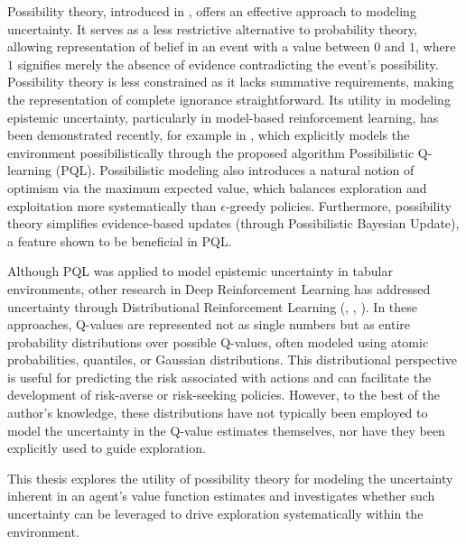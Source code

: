 \documentclass[11pt,a4paper]{report}
\begin{document}
\par
Possibility theory, introduced in \cite{ZADEH19999}, offers an effective approach to modeling uncertainty. It serves as a less restrictive alternative to probability theory, allowing representation of belief in an event with a value between $0$ and $1$, where $1$ signifies merely the absence of evidence contradicting the event's possibility. Possibility theory is less constrained as it lacks summative requirements, making the representation of complete ignorance straightforward. Its utility in modeling epistemic uncertainty, particularly in model-based reinforcement learning, has been demonstrated recently, for example in \cite{thomas2025}, which explicitly models the environment possibilistically through the proposed algorithm Possibilistic Q-learning (PQL). Possibilistic modeling also introduces a natural notion of optimism via the maximum expected value, which balances exploration and exploitation more systematically than $\epsilon$-greedy policies. Furthermore, possibility theory simplifies evidence-based updates (through Possibilistic Bayesian Update), a feature shown to be beneficial in PQL.

\par
Although PQL was applied to model epistemic uncertainty in tabular environments, other research in Deep Reinforcement Learning has addressed uncertainty through Distributional Reinforcement Learning (\cite{bellemare2017}, \cite{dabney2017distributionalreinforcementlearningquantile}, \cite{zhang2022meanvariancepolicyiterationriskaverse}). In these approaches, Q-values are represented not as single numbers but as entire probability distributions over possible Q-values, often modeled using atomic probabilities, quantiles, or Gaussian distributions. This distributional perspective is useful for predicting the risk associated with actions and can facilitate the development of risk-averse or risk-seeking policies. However, to the best of the author's knowledge, these distributions have not typically been employed to model the uncertainty in the Q-value estimates themselves, nor have they been explicitly used to guide exploration.

\par
This thesis explores the utility of possibility theory for modeling the uncertainty inherent in an agent's value function estimates and investigates whether such uncertainty can be leveraged to drive exploration systematically within the environment.
\end{document}
